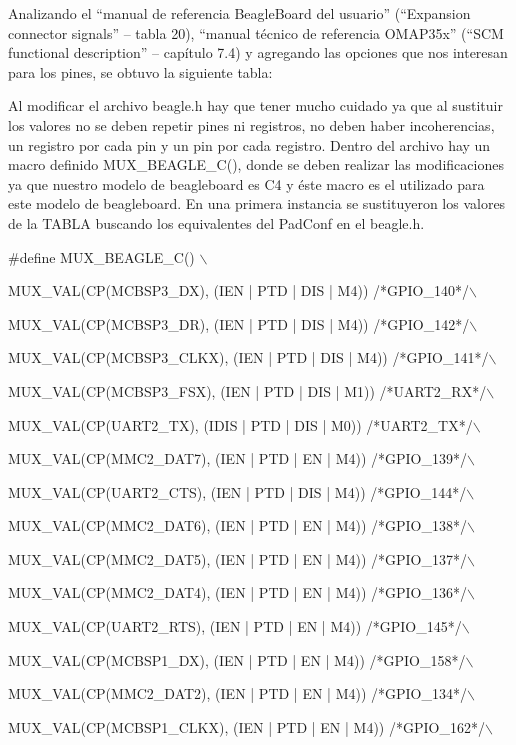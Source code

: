Analizando el “manual de referencia BeagleBoard del usuario” (“Expansion connector signals” – 
tabla 20), “manual técnico de referencia OMAP35x” (“SCM functional description” – capítulo 7.4) 
y agregando las opciones que nos interesan para los pines, se obtuvo la siguiente tabla: 

Al modificar el archivo beagle.h hay que tener mucho cuidado ya que al sustituir los valores no se deben repetir pines ni registros, no deben haber incoherencias, un registro por cada pin y un pin por cada registro. 
Dentro del archivo hay un macro definido MUX\_BEAGLE\_C(), donde se deben realizar las modificaciones ya que nuestro modelo de beagleboard es C4 y éste macro es el utilizado para este modelo de beagleboard.
En una primera instancia se sustituyeron los valores de la TABLA buscando los equivalentes del 
PadConf en el beagle.h. 

\#define MUX\_BEAGLE\_C() $\backslash$  

MUX\_VAL(CP(MCBSP3\_DX),	(IEN  | PTD | DIS | M4)) /*GPIO\_140*/$\backslash$  

MUX\_VAL(CP(MCBSP3\_DR),	(IEN  | PTD | DIS | M4)) /*GPIO\_142*/$\backslash$  

MUX\_VAL(CP(MCBSP3\_CLKX),	(IEN  | PTD | DIS | M4)) /*GPIO\_141*/$\backslash$  

MUX\_VAL(CP(MCBSP3\_FSX),	(IEN  | PTD | DIS | M1)) /*UART2\_RX*/$\backslash$  

MUX\_VAL(CP(UART2\_TX),		(IDIS | PTD | DIS | M0)) /*UART2\_TX*/$\backslash$  

MUX\_VAL(CP(MMC2\_DAT7),	(IEN  | PTD | EN  | M4)) /*GPIO\_139*/$\backslash$  

MUX\_VAL(CP(UART2\_CTS),	(IEN  | PTD | DIS | M4)) /*GPIO\_144*/$\backslash$  

MUX\_VAL(CP(MMC2\_DAT6),	(IEN  | PTD | EN  | M4)) /*GPIO\_138*/$\backslash$  

MUX\_VAL(CP(MMC2\_DAT5),	(IEN  | PTD | EN  | M4)) /*GPIO\_137*/$\backslash$  

MUX\_VAL(CP(MMC2\_DAT4),	(IEN  | PTD | EN  | M4)) /*GPIO\_136*/$\backslash$  

MUX\_VAL(CP(UART2\_RTS),	(IEN  | PTD | EN  | M4)) /*GPIO\_145*/$\backslash$  

MUX\_VAL(CP(MCBSP1\_DX),	(IEN  | PTD | EN  | M4)) /*GPIO\_158*/$\backslash$  

MUX\_VAL(CP(MMC2\_DAT2),	(IEN  | PTD | EN  | M4)) /*GPIO\_134*/$\backslash$  

MUX\_VAL(CP(MCBSP1\_CLKX),	(IEN  | PTD | EN  | M4)) /*GPIO\_162*/$\backslash$  

